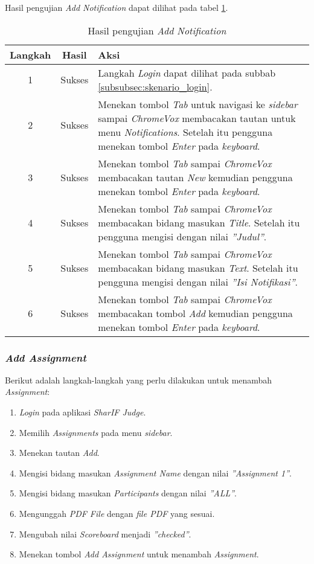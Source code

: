 Hasil pengujian \textit{Add Notification} dapat dilihat pada tabel \ref{tab:hasil_add_notification}.

\begin{table}[H]
	\centering
	\caption{Hasil pengujian \textit{Add Notification}}
	\label{tab:hasil_add_notification}
	\begin{tabular}{|c|c|p{12cm}|}
		\toprule
		Langkah & Hasil & Aksi\\
		\midrule
		1 & Sukses & Langkah \textit{Login} dapat dilihat pada subbab \ref{subsubsec:skenario_login}.\\
		2 & Sukses & Menekan tombol \textit{Tab} untuk navigasi ke \textit{sidebar} sampai \textit{ChromeVox} membacakan tautan untuk menu \textit{Notifications}. Setelah itu pengguna menekan tombol \textit{Enter} pada \textit{keyboard}.\\
		3 & Sukses & Menekan tombol \textit{Tab} sampai \textit{ChromeVox} membacakan tautan \textit{New} kemudian pengguna menekan tombol \textit{Enter} pada \textit{keyboard}.\\
		4 & Sukses & Menekan tombol \textit{Tab} sampai \textit{ChromeVox} membacakan bidang masukan \textit{Title}. Setelah itu pengguna mengisi dengan nilai \textit{''Judul''}.\\
		5 & Sukses & Menekan tombol \textit{Tab} sampai \textit{ChromeVox} membacakan bidang masukan \textit{Text}. Setelah itu pengguna mengisi dengan nilai \textit{''Isi Notifikasi''}.\\
		6 & Sukses & Menekan tombol \textit{Tab} sampai \textit{ChromeVox} membacakan tombol \textit{Add} kemudian pengguna menekan tombol \textit{Enter} pada \textit{keyboard}.\\
		\bottomrule
	\end{tabular}
\end{table}

\subsubsection{\textit{Add Assignment}}
\label{subsubsec:skenario_add_assignment}
Berikut adalah langkah-langkah yang perlu dilakukan untuk menambah \textit{Assignment}:

\begin{enumerate}
	\item \textit{Login} pada aplikasi \textit{SharIF Judge}.
	\item Memilih \textit{Assignments} pada menu \textit{sidebar}.
	\item Menekan tautan \textit{Add}.
	\item Mengisi bidang masukan \textit{Assignment Name} dengan nilai \textit{''Assignment 1''}.
	\item Mengisi bidang masukan \textit{Participants} dengan nilai \textit{''ALL''}.
	\item Mengunggah \textit{PDF File} dengan \textit{file PDF} yang sesuai.
	\item Mengubah nilai \textit{Scoreboard} menjadi \textit{''checked''}.
	\item Menekan tombol \textit{Add Assignment} untuk menambah \textit{Assignment}.
\end{enumerate}

